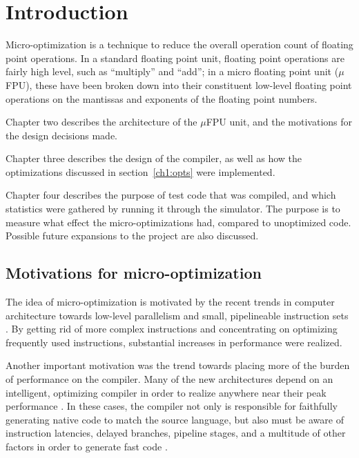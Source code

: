 \chapter{Introduction}

Micro-optimization is a technique to reduce the overall operation count of
floating point operations.  In a standard floating point unit, floating
point operations are fairly high level, such as ``multiply'' and ``add'';
in a micro floating point unit ($\mu$FPU), these have been broken down into
their constituent low-level floating point operations on the mantissas and
exponents of the floating point numbers.

Chapter two describes the architecture of the $\mu$FPU unit, and the
motivations for the design decisions made.

Chapter three describes the design of the compiler, as well as how the
optimizations discussed in section~\ref{ch1:opts} were implemented.

Chapter four describes the purpose of test code that was compiled, and which
statistics were gathered by running it through the simulator.  The purpose
is to measure what effect the micro-optimizations had, compared to
unoptimized code.  Possible future expansions to the project are also
discussed.

\section{Motivations for micro-optimization}

The idea of micro-optimization is motivated by the recent trends in computer
architecture towards low-level parallelism and small, pipelineable
instruction sets \cite{patterson:risc,rad83}.  By getting rid of more
complex instructions and concentrating on optimizing frequently used
instructions, substantial increases in performance were realized.

Another important motivation was the trend towards placing more of the
burden of performance on the compiler.  Many of the new architectures depend
on an intelligent, optimizing compiler in order to realize anywhere near
their peak performance
\cite{ellis:bulldog,pet87,coutant:precision-compilers}.  In these cases, the
compiler not only is responsible for faithfully generating native code to
match the source language, but also must be aware of instruction latencies,
delayed branches, pipeline stages, and a multitude of other factors in order
to generate fast code \cite{gib86}.

